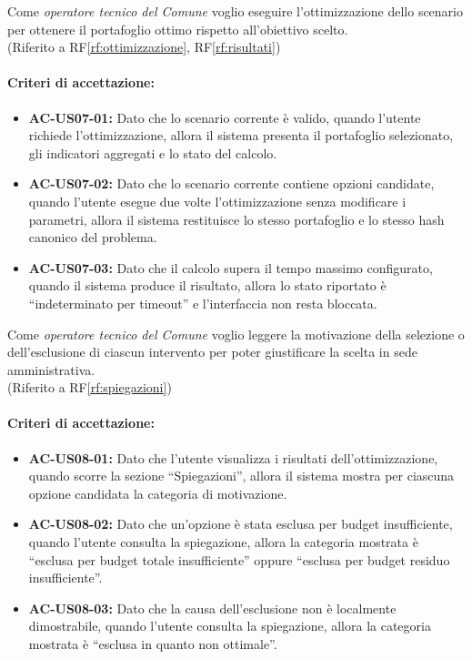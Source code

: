  \label{us:ottimizza}
Come \textit{operatore tecnico del Comune} voglio eseguire l'ottimizzazione dello scenario per ottenere il portafoglio ottimo rispetto all'obiettivo scelto. \\ (Riferito a RF\ref{rf:ottimizzazione}, RF\ref{rf:risultati})

\paragraph{Criteri di accettazione:}
\begin{itemize}
    \item \textbf{AC-US07-01:} Dato che lo scenario corrente è valido, quando l'utente richiede l'ottimizzazione, allora il sistema presenta il portafoglio selezionato, gli indicatori aggregati e lo stato del calcolo.
    \item \textbf{AC-US07-02:} Dato che lo scenario corrente contiene opzioni candidate, quando l'utente esegue due volte l'ottimizzazione senza modificare i parametri, allora il sistema restituisce lo stesso portafoglio e lo stesso hash canonico del problema.
    \item \textbf{AC-US07-03:} Dato che il calcolo supera il tempo massimo configurato, quando il sistema produce il risultato, allora lo stato riportato è ``indeterminato per timeout'' e l'interfaccia non resta bloccata.
\end{itemize}

 \label{us:spiegazioni}
Come \textit{operatore tecnico del Comune} voglio leggere la motivazione della selezione o dell'esclusione di ciascun intervento per poter giustificare la scelta in sede amministrativa. \\ (Riferito a RF\ref{rf:spiegazioni})

\paragraph{Criteri di accettazione:}
\begin{itemize}
    \item \textbf{AC-US08-01:} Dato che l'utente visualizza i risultati dell'ottimizzazione, quando scorre la sezione ``Spiegazioni'', allora il sistema mostra per ciascuna opzione candidata la categoria di motivazione.
    \item \textbf{AC-US08-02:} Dato che un'opzione è stata esclusa per budget insufficiente, quando l'utente consulta la spiegazione, allora la categoria mostrata è ``esclusa per budget totale insufficiente'' oppure ``esclusa per budget residuo insufficiente''.
    \item \textbf{AC-US08-03:} Dato che la causa dell'esclusione non è localmente dimostrabile, quando l'utente consulta la spiegazione, allora la categoria mostrata è ``esclusa in quanto non ottimale''.
\end{itemize}

